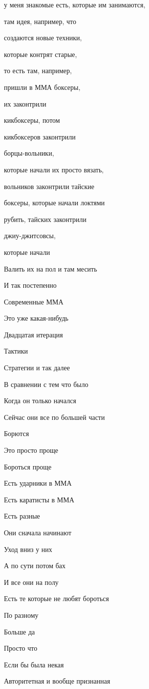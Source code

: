 у меня знакомые есть, которые им занимаются,

там идея, например, что

создаются новые техники,

которые контрят старые,

то есть там, например,

пришли в ММА боксеры,

их законтрили

кикбоксеры, потом

кикбоксеров законтрили

борцы-вольники,

которые начали их просто вязать,

вольников законтрили тайские

боксеры, которые начали локтями

рубить, тайских законтрили

джиу-джитсовсы,

которые начали

Валить их на пол и там месить

И так постепенно

Современные ММА

Это уже какая-нибудь

Двадцатая итерация

Тактики

Стратегии и так далее

В сравнении с тем что было

Когда он только начался

Сейчас они все по большей части

Борются

Это просто проще

Бороться проще

Есть ударники в ММА

Есть каратисты в ММА

Есть разные

Они сначала начинают

Уход вниз у них

А по сути потом бах

И все они на полу

Есть те которые не любят бороться

По разному

Больше да

Просто что

Если бы была некая

Авторитетная и вообще признанная

